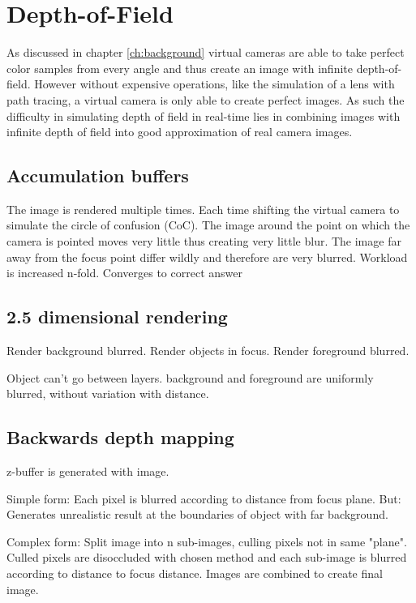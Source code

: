 \chapter{Depth-of-Field}
As discussed in chapter \ref{ch:background} virtual cameras are able to take perfect color samples from every angle and thus create an image with infinite depth-of-field.
However without expensive operations, like the simulation of a lens with path tracing, a virtual camera is only able to create perfect images.
As such the difficulty in simulating depth of field in real-time lies in combining images with infinite depth of field into good approximation of real camera images.
\section{Accumulation buffers}
The image is rendered multiple times.
Each time shifting the virtual camera to simulate the circle of confusion (CoC).
The image around the point on which the camera is pointed moves very little thus creating very little blur.
The image far away from the focus point differ wildly and therefore are very blurred.
Workload is increased n-fold. Converges to correct answer

\section{2.5 dimensional rendering}
Render background blurred.
Render objects in focus.
Render foreground blurred.

Object can't go between layers.
background and foreground are uniformly blurred, without variation with distance.

\section{Backwards depth mapping}
z-buffer is generated with image.

Simple form: Each pixel is blurred according to distance from focus plane.
But: Generates unrealistic result at the boundaries of object with far background.

Complex form: Split image into n sub-images, culling pixels not in same "plane".
Culled pixels are disoccluded with chosen method and each sub-image is blurred according to distance to focus distance.
Images are combined to create final image.

